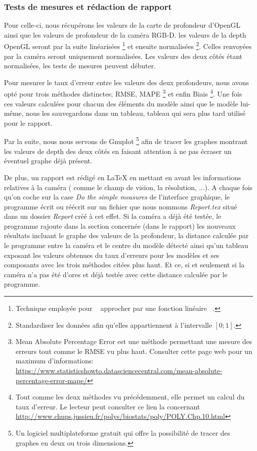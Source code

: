 \documentclass[a4paper, 12pt]{book}
\newcounter{program}[subsection]
\begin{document}
\subsubsection{Tests de mesures et rédaction de rapport}
Pour celle-ci, nous récupérons les valeurs de la carte de profondeur d'OpenGL ainsi que les valeurs de profondeur de la caméra RGB-D. les valeurs de la depth OpenGL seront par la suite linéarisées \footnote{Technique employée pour \guillemotleft{}~ approcher par une fonction linéaire ~\guillemotright{}.} et ensuite normalisées \footnote{Standardiser les données afin qu'elles appartiennent à l'intervalle $ \left[0;1\right] $.}. Celles renvoyées par la caméra seront uniquement normalisées. Les valeurs des deux côtés étant normalisées, les tests de mesures peuvent débuter. \par Pour mesurer le taux d'erreur entre les valeurs des deux profondeurs, nous avons opté pour trois méthodes distinctes; RMSE, MAPE \footnote{Mean Absolute Percentage Error est une méthode permettant une mesure des erreurs tout comme le RMSE vu plus haut. Consulter cette page web pour un maximum d'informations: \url{https://www.statisticshowto.datasciencecentral.com/mean-absolute-percentage-error-mape/} } et enfin Biais \footnote{Tout comme les deux méthodes vu précédemment, elle permet un calcul du taux d'erreur. Le lecteur peut consulter ce lien la concernant \url{http://www.chups.jussieu.fr/polys/biostats/poly/POLY.Chp.10.html}}. Une fois ces valeurs calculées pour chacun des éléments du modèle ainsi que le modèle lui-même, nous les sauvegardons dans un tableau, tableau qui sera plus tard utilisé pour le rapport. \par Par la suite, nous nous servons de Gnuplot \footnote{Un logiciel multiplateforme gratuit qui offre la possibilité de tracer des graphes en deux ou trois dimensions.} afin de tracer les graphes montrant les valeurs de depth des deux côtés en faisant attention à ne pas écraser un éventuel graphe déjà présent. 
\par De plus, un rapport est rédigé en \LaTeX{} en mettant en avant les informations relatives à la caméra ( comme le champ de vision, la résolution, ...). A chaque fois qu'on coche sur la case \textit{Do the simple measures} de l'interface graphique, le programme écrit ou réécrit sur un fichier que nous nommons \emph{Report.tex} situé dans un dossier \emph{Report} créé à cet effet. Si la caméra a déjà été testée, le programme rajoute dans la section concernée (dans le rapport) les nouveaux résultats incluant le graphe des valeurs de la profondeur, la distance calculée par le programme entre la caméra et le centre du modèle détecté ainsi qu'un tableau exposant les valeurs obtenues du taux d'erreurs pour les modèles et ses composants  avec les trois méthodes citées plus haut. Et ce, si et seulement si la caméra n'a pas été d'ores et déjà testée avec cette distance calculée par le programme.
\end{document}

